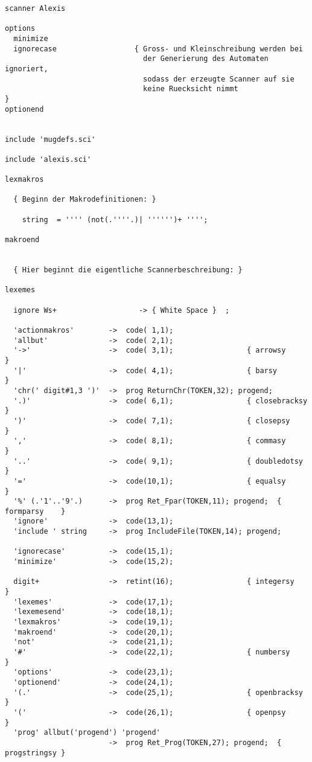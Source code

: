 \begin{verbatim}
scanner Alexis
 
options
  minimize
  ignorecase                  { Gross- und Kleinschreibung werden bei
                                der Generierung des Automaten ignoriert,
                                sodass der erzeugte Scanner auf sie
                                keine Ruecksicht nimmt                  }
optionend
 
 
include 'mugdefs.sci'

include 'alexis.sci'
 
lexmakros
 
  { Beginn der Makrodefinitionen: }
 
    string  = '''' (not(.''''.)| '''''')+ '''';
 
makroend
 
 
  { Hier beginnt die eigentliche Scannerbeschreibung: }
 
lexemes
 
  ignore Ws+                   -> { White Space }  ;
 
  'actionmakros'        ->  code( 1,1);
  'allbut'              ->  code( 2,1);
  '->'                  ->  code( 3,1);                 { arrowsy      }
  '|'                   ->  code( 4,1);                 { barsy        }
  'chr(' digit#1,3 ')'  ->  prog ReturnChr(TOKEN,32); progend;
  '.)'                  ->  code( 6,1);                 { closebracksy }
  ')'                   ->  code( 7,1);                 { closepsy     }
  ','                   ->  code( 8,1);                 { commasy      }
  '..'                  ->  code( 9,1);                 { doubledotsy  }
  '='                   ->  code(10,1);                 { equalsy      }
  '%' (.'1'..'9'.)      ->  prog Ret_Fpar(TOKEN,11); progend;  { formparsy    }
  'ignore'              ->  code(13,1);
  'include ' string     ->  prog IncludeFile(TOKEN,14); progend;
 
  'ignorecase'          ->  code(15,1);
  'minimize'            ->  code(15,2);
 
  digit+                ->  retint(16);                 { integersy    }
  'lexemes'             ->  code(17,1);
  'lexemesend'          ->  code(18,1);
  'lexmakros'           ->  code(19,1);
  'makroend'            ->  code(20,1);
  'not'                 ->  code(21,1);
  '#'                   ->  code(22,1);                 { numbersy     }
  'options'             ->  code(23,1);
  'optionend'           ->  code(24,1);
  '(.'                  ->  code(25,1);                 { openbracksy  }
  '('                   ->  code(26,1);                 { openpsy      }
  'prog' allbut('progend') 'progend'
                        ->  prog Ret_Prog(TOKEN,27); progend;  { progstringsy }
 

\end{verbatim}
